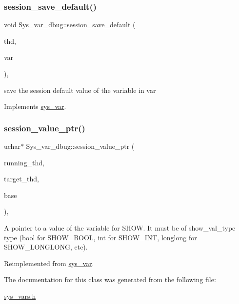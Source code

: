 \subsubsection{\texorpdfstring{session\+\_\+save\+\_\+default()}{session\_save\_default()}}
{\footnotesize\ttfamily void Sys\+\_\+var\+\_\+dbug\+::session\+\_\+save\+\_\+default (\begin{DoxyParamCaption}\item[{T\+HD $\ast$}]{thd,  }\item[{\mbox{\hyperlink{classset__var}{set\+\_\+var}} $\ast$}]{var }\end{DoxyParamCaption})\hspace{0.3cm}{\ttfamily [inline]}, {\ttfamily [virtual]}}

save the session default value of the variable in var 

Implements \mbox{\hyperlink{classsys__var}{sys\+\_\+var}}.

\mbox{\label{classSys__var__dbug_a29c18e5e94b1a579df89714a8adffdaf}} 
\subsubsection{\texorpdfstring{session\+\_\+value\+\_\+ptr()}{session\_value\_ptr()}}
{\footnotesize\ttfamily uchar$\ast$ Sys\+\_\+var\+\_\+dbug\+::session\+\_\+value\+\_\+ptr (\begin{DoxyParamCaption}\item[{T\+HD $\ast$}]{running\+\_\+thd,  }\item[{T\+HD $\ast$}]{target\+\_\+thd,  }\item[{L\+E\+X\+\_\+\+S\+T\+R\+I\+NG $\ast$}]{base }\end{DoxyParamCaption})\hspace{0.3cm}{\ttfamily [inline]}, {\ttfamily [virtual]}}

A pointer to a value of the variable for S\+H\+OW. It must be of show\+\_\+val\+\_\+type type (bool for S\+H\+O\+W\+\_\+\+B\+O\+OL, int for S\+H\+O\+W\+\_\+\+I\+NT, longlong for S\+H\+O\+W\+\_\+\+L\+O\+N\+G\+L\+O\+NG, etc). 

Reimplemented from \mbox{\hyperlink{classsys__var_a3e511591aaf555d2bc2ce40a80b7e899}{sys\+\_\+var}}.



The documentation for this class was generated from the following file\+:\begin{DoxyCompactItemize}
\item 
\mbox{\hyperlink{sys__vars_8h}{sys\+\_\+vars.\+h}}\end{DoxyCompactItemize}
